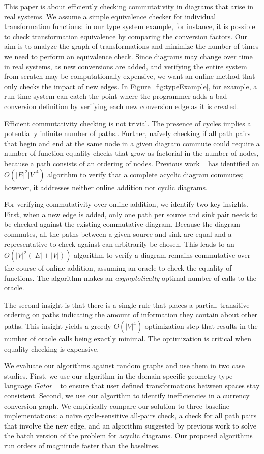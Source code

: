 \documentclass[sigplan,review,nonacm=true]{acmart}
\begin{document}
This paper is about efficiently checking commutativity in diagrams that arise in real systems.
We assume a simple equivalence checker for individual transformation functions: in our type system example, for instance, it is possible to check transformation equivalence by comparing the conversion factors.
Our aim is to analyze the graph of transformations and minimize the number of times we need to perform an equivalence check.
Since diagrams may change over time in real systems, as new conversions are added, and verifying the entire system from scratch may be computationally expensive, we want an online method that only checks the impact of new edges.
In Figure~\ref{fig:typeExample}, for example, a run-time system can catch the point where the programmer adds a bad conversion definition by verifying each new conversion edge as it is created.

Efficient commutativity checking is not trivial.
The presence of cycles implies a potentially infinite number of paths..
Further, na\"{i}vely checking if all path pairs that begin and end at the same node in a given diagram commute could require a number of function equality checks that grow as factorial in the number of nodes, because a path consists of an ordering of nodes.
Previous work ~\cite{commutative} has identified an $O(|E|^2|V|^4)$ algorithm to verify that a complete acyclic diagram commutes; however, it addresses neither online addition nor cyclic diagrams.

For verifying commutativity over online addition, we identify two key insights.
First, when a new edge is added,
only one path per source and sink pair needs to be checked against the existing commutative diagram.
Because the diagram commutes, all the paths between a given source and sink are equal and a representative to check against can arbitrarily be chosen.
This leads to an $O(|V|^2(|E|+|V|))$ algorithm to verify a diagram remains commutative over the course of online addition, assuming an oracle to check the equality of functions.
The algorithm makes an \emph{asymptotically} optimal number of calls to the oracle.

The second insight is that there is a single rule that places a partial, transitive ordering on paths indicating the amount of information they contain about other paths.
This insight yields a greedy $O(|V|^4)$ optimization step that results in the number of oracle calls being exactly minimal.
The optimization is critical when equality checking is expensive.

We evaluate our algorithms against random graphs and use them in two case studies.
First, we use our algorithm in the domain specific geometry type language \textit{Gator} ~\cite{gator} to ensure that user defined transformations between spaces stay consistent.
Second, we use our algorithm to identify inefficiencies in a currency conversion graph.
%
We empirically compare our solution to three baseline implementations: a na\"{i}ve cycle-sensitive all-pairs check, a check for all path pairs that involve the new edge, and an algorithm suggested by previous work to solve the batch version of the problem for acyclic diagrams.
Our proposed algorithms run orders of magnitude faster than the baselines.
\end{document}
